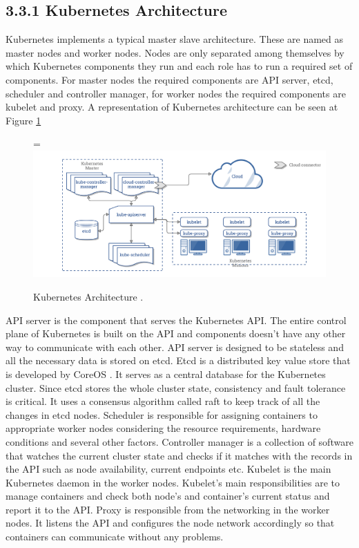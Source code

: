 \documentclass[12pt,oneandhalf,chaparabic,ceng,ms,eng,oneside,pntc]{gsufbe}
\makeatletter
\let\old@includegraphics\includegraphics
\renewcommand{\includegraphics}[2][,]{%
  \setbox9=\hbox{\old@includegraphics[#1]{#2}}%
  \ifdim\wd9>\textwidth
    \old@includegraphics[#1,width=\textwidth]{#2}%
  \else
    \old@includegraphics[#1]{#2}%
  \fi%
}
\makeatother
\begin{document}
\subsection[Kubernetes Architecture]{3.3.1 Kubernetes Architecture}
Kubernetes implements a typical master slave architecture.  These are named as master nodes and worker
nodes.  Nodes are only separated among themselves by which Kubernetes components they run and each role 
has to run a required set of components.  For master nodes the required components are API server, etcd,
scheduler and
controller manager, for worker nodes the required components are kubelet and proxy.  A representation
of Kubernetes architecture can be seen at Figure \ref{fig:k8sarch}

\begin{figure}
\centering
\includegraphics[]{k8s-arch.png}
\caption{Kubernetes Architecture \cite{kube_arch}.}
\label{fig:k8sarch}
\end{figure}

API server is the component that serves the Kubernetes API.  The entire control plane of Kubernetes is
built on the API and components doesn't have any other way to communicate with each other.  API server
is designed to be stateless and all the necessary data is stored on etcd.
Etcd is a distributed key value store that is developed by CoreOS \cite{coreos}.  It serves as a central database for
the Kubernetes cluster.  Since etcd stores the whole cluster state, consistency and fault tolerance is
critical.  It uses a consensus algorithm called raft \cite{raft} to keep track of all the changes in etcd nodes.
Scheduler is responsible for assigning containers to appropriate worker nodes considering the resource
requirements, hardware conditions and several other factors.
Controller manager is a collection of software that watches the current cluster state and checks if it
matches with the records in the API such as node availability, current endpoints etc.
Kubelet is the main Kubernetes daemon in the worker nodes.  Kubelet's main responsibilities are to 
manage containers and check both node's and container's current status and report it to the API.
Proxy is responsible from the networking in the worker nodes.  It listens the API and configures the
node network accordingly so that containers can communicate without any problems.
\end{document}
